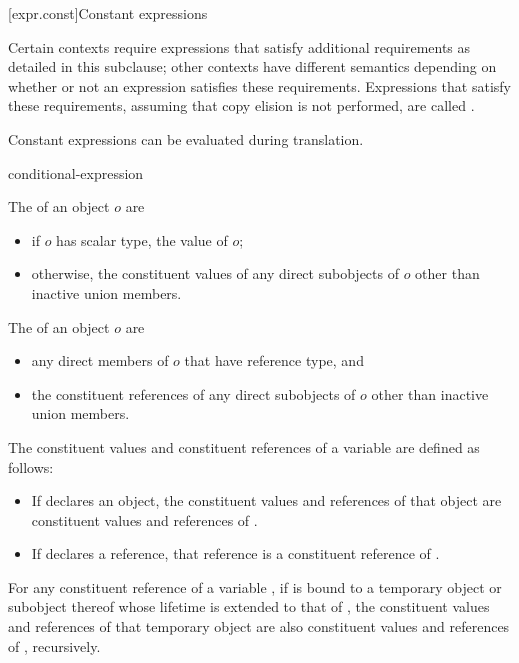 [expr.const]{Constant expressions}%

\pnum
Certain contexts require expressions that satisfy additional
requirements as detailed in this subclause; other contexts have different
semantics depending on whether or not an expression satisfies these requirements.
Expressions that satisfy these requirements,
assuming that copy elision is not performed,
are called
%
.
\begin{note}
Constant expressions can be evaluated
during translation.
\end{note}

\begin{bnf}
\br
    conditional-expression
\end{bnf}

\pnum
The  of an object $o$ are
\begin{itemize}
\item
if $o$ has scalar type, the value of $o$;
\item
otherwise, the constituent values of any direct subobjects of $o$
other than inactive union members.
\end{itemize}
The  of an object $o$ are
\begin{itemize}
\item
any direct members of $o$ that have reference type, and
\item
the constituent references of any direct subobjects of $o$
other than inactive union members.
\end{itemize}

\pnum
The constituent values and constituent references of
a variable  are defined as follows:
\begin{itemize}
\item
If  declares an object,
the constituent values and references of that object are
constituent values and references of .
\item
If  declares a reference,
that reference is a constituent reference of .
\end{itemize}
For any constituent reference  of a variable ,
if  is bound to a temporary object or subobject thereof
whose lifetime is extended to that of ,
the constituent values and references of that temporary object
are also constituent values and references of , recursively.

